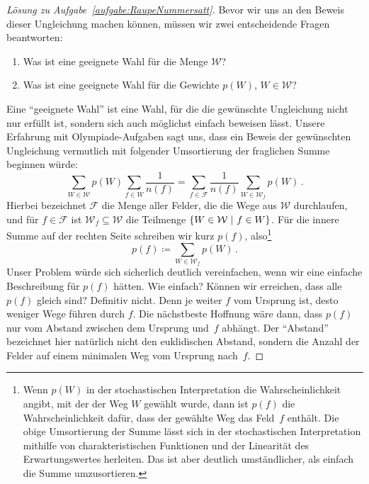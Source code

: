 \begin{proof}[Lösung zu Aufgabe~\ref{aufgabe:RaupeNummersatt}]
	Bevor wir uns an den Beweis dieser Ungleichung machen können, müssen wir zwei entscheidende Fragen beantworten:
	\begin{enumerate}[label={$(\arabic*)$},ref={$(\arabic*)$}]\itshape
		\item Was ist eine geeignete Wahl für die Menge $\mathcal W$?\label{frage:WasIstW?}
		\item Was ist eine geeignete Wahl für die Gewichte $p(W)$, $W\in\mathcal W$?\label{frage:WasFuerGewichte?}
	\end{enumerate}
	Eine \enquote{geeignete Wahl} ist eine Wahl, für die die gewünschte Ungleichung nicht nur erfüllt ist, sondern sich auch möglichst einfach beweisen lässt. Unsere Erfahrung mit Olympiade-Aufgaben sagt uns, dass ein Beweis der gewünschten Ungleichung vermutlich mit folgender Umsortierung der fraglichen Summe beginnen würde:
	\begin{equation*}
		\sum_{W\in \mathcal{W}} p(W)\sum_{f\in W} \frac{1}{n(f)}=\sum_{f\in\mathcal F}\frac{1}{n(f)}\sum_{W\in \mathcal W_f}p(W)\,.
	\end{equation*}
	Hierbei bezeichnet $\mathcal F$ die Menge aller Felder, die die Wege aus $\mathcal W$ durchlaufen, und für $f\in \mathcal F$ ist $\mathcal W_f\subseteq \mathcal W$ die Teilmenge $\braces*{W\in\mathcal W\ \middle|\ f\in W}$. Für die innere Summe auf der rechten Seite schreiben wir kurz $p(f)$, also\footnote{Wenn $p(W)$ in der stochastischen Interpretation die Wahrscheinlichkeit angibt, mit der der Weg $W$ gewählt wurde, dann ist $p(f)$ die Wahrscheinlichkeit dafür, dass der gewählte Weg das Feld~$f$ enthält. Die obige Umsortierung der Summe lässt sich in der stochastischen Interpretation mithilfe von charakteristischen Funktionen und der Linearität des Erwartungswertes herleiten. Das ist aber deutlich umständlicher, als einfach die Summe umzusortieren.}
	\begin{equation*}
		p(f)\coloneqq\sum_{W\in\mathcal{W}_f}p(W)\,.
	\end{equation*}
	Unser Problem würde sich sicherlich deutlich vereinfachen, wenn wir eine einfache Beschreibung für $p(f)$ hätten. Wie einfach? Können wir erreichen, dass alle $p(f)$ gleich sind? Definitiv nicht. Denn je weiter $f$ vom Ursprung ist, desto weniger Wege führen durch $f$. Die nächstbeste Hoffnung wäre dann, dass $p(f)$ nur vom Abstand zwischen dem Ursprung und~$f$ abhängt. Der \enquote{Abstand} bezeichnet hier natürlich nicht den euklidischen Abstand, sondern die Anzahl der Felder auf einem minimalen Weg vom Ursprung nach~$f$.
	

\end{proof}
